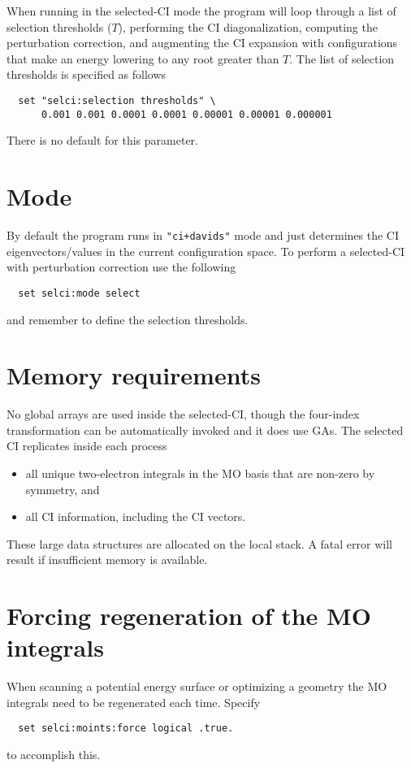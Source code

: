 When running in the selected-CI mode the program will loop
through a list of selection thresholds ($T$), performing the CI
diagonalization, computing the perturbation correction, and augmenting
the CI expansion with configurations that make an energy lowering to
any root greater than $T$.  The list of selection thresholds is
specified as follows
\begin{verbatim}
  set "selci:selection thresholds" \
      0.001 0.001 0.0001 0.0001 0.00001 0.00001 0.000001
\end{verbatim}

There is no default for this parameter.


\section{Mode}

By default the program runs in \verb="ci+davids"= mode and just
determines the CI eigenvectors/values in the current configuration
space.  To perform a selected-CI with perturbation correction use the
following
\begin{verbatim}
  set selci:mode select
\end{verbatim}
and remember to define the selection thresholds.

\section{Memory requirements}

No global arrays are used inside the selected-CI, though the
four-index transformation can be automatically invoked and it does use
GAs.  The selected CI replicates inside each process
\begin{itemize}
\item all unique two-electron integrals in the MO basis that are
  non-zero by symmetry, and
\item all CI information, including the CI vectors.
\end{itemize}
These large data structures are allocated on the local stack.  A fatal
error will result if insufficient memory is available.

\section{Forcing regeneration of the MO integrals}

When scanning a potential energy surface or optimizing a geometry the
MO integrals need to be regenerated each time.  Specify
\begin{verbatim}
  set selci:moints:force logical .true.
\end{verbatim}
to accomplish this.

